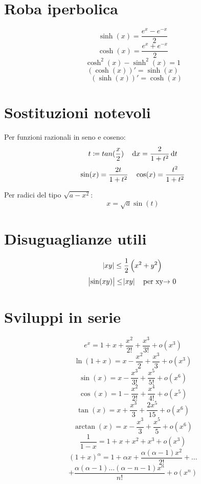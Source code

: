 \documentclass[a4paper,portrait,columns=3,5pt]{cheatsheet}
\begin{document}
\section{Roba iperbolica}
$$ \sinh(x) = \frac{e^x - e^{-x}}{2} $$
$$\cosh(x) = \frac{e^x + e^{-x}}{2}$$
$$ \cosh^2(x) - \sinh^2(x) = 1 $$
$$ (\cosh(x))' = \sinh(x)$$
$$ \quad (\sinh(x))' = \cosh(x) $$
\section{Sostituzioni notevoli}
Per funzioni razionali in seno e coseno: 
$$t \coloneqq tan(\frac{x}{2})\quad \dif x = \frac{2}{1 + t^2} \dif t$$
$$ \sin(x) = \frac{2t}{1+t^2} \quad \cos(x) = \frac{\-t^2}{1+t^2}$$

Per radici del tipo $\sqrt{a - x^2}$:
$$ x = \sqrt{a} \sin(t) $$

\section{Disuguaglianze utili}
$$ \abs{xy} \leq \frac{1}{2}\left(x^2 + y^2\right) $$
$$ \abs{\sin(xy)} \leq \abs{xy}\quad \text{per xy$\rightarrow$ 0}$$
\section{Sviluppi in serie}
$$ e^x = 1 + x + \frac{x^2}{2!} + \frac{x^3}{3!} + o(x^3)$$
$$ \ln(1 + x) = x - \frac{x^2}{2} + \frac{x^3}{3} + o(x^3)$$
$$ \sin(x) = x - \frac{x^3}{3!} + \frac{x^5}{5!} + o(x^6)$$
$$ \cos(x) = 1 - \frac{x^2}{2!} + \frac{x^4}{4!} + o(x^5)$$
$$ \tan(x) = x + \frac{x^3}{3} + \frac{2x^5}{15} + o(x^6)$$
$$ \arctan(x) = x - \frac{x^3}{3} + \frac{x^5}{5} + o(x^6)$$
$$ \frac{1}{1-x} = 1 + x + x^2 + x^3 + o(x^3)$$
$$(1 + x) ^ \alpha = 1 + \alpha x + \frac{\alpha (\alpha - 1)x^2}{2!} + \dots $$
$$ + \frac{\alpha(\alpha - 1)\dots (\alpha - n - 1) x^n}{n!} + o(x^n) $$
\end{document}
